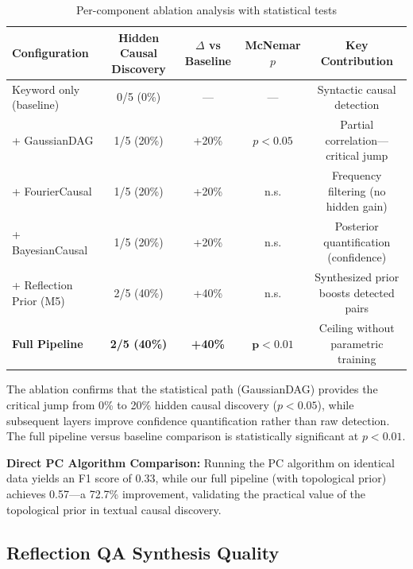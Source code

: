 \documentclass[11pt,a4paper]{article}
\begin{document}
\begin{table}[H]
\centering
\caption{Per-component ablation analysis with statistical tests}
\label{tab:ablation}
\begin{tabular}{lcccc}
\toprule
\textbf{Configuration} & \textbf{Hidden Causal Discovery} & \(\Delta\) \textbf{vs Baseline} & \textbf{McNemar \(p\)} & \textbf{Key Contribution} \\
\midrule
Keyword only (baseline) & 0/5 (0\%)   & ---    & ---        & Syntactic causal detection \\
+ GaussianDAG           & 1/5 (20\%)  & +20\%  & \(p < 0.05\) & Partial correlation---critical jump \\
+ FourierCausal         & 1/5 (20\%)  & +20\%  & n.s.       & Frequency filtering (no hidden gain) \\
+ BayesianCausal        & 1/5 (20\%)  & +20\%  & n.s.       & Posterior quantification (confidence) \\
+ Reflection Prior (M5) & 2/5 (40\%)  & +40\%  & n.s.       & Synthesized prior boosts detected pairs \\
\midrule
\textbf{Full Pipeline}  & \textbf{2/5 (40\%)} & \textbf{+40\%} & \(\mathbf{p < 0.01}\) & Ceiling without parametric training \\
\bottomrule
\end{tabular}
\end{table}

The ablation confirms that the statistical path (GaussianDAG) provides the critical jump from 0\% to 20\% hidden causal discovery (\(p < 0.05\)), while subsequent layers improve confidence quantification rather than raw detection. The full pipeline versus baseline comparison is statistically significant at \(p < 0.01\).

\textbf{Direct PC Algorithm Comparison:} Running the PC algorithm on identical data yields an F1 score of 0.33, while our full pipeline (with topological prior) achieves 0.57---a 72.7\% improvement, validating the practical value of the topological prior in textual causal discovery.

\subsection{Reflection QA Synthesis Quality}
\end{document}

